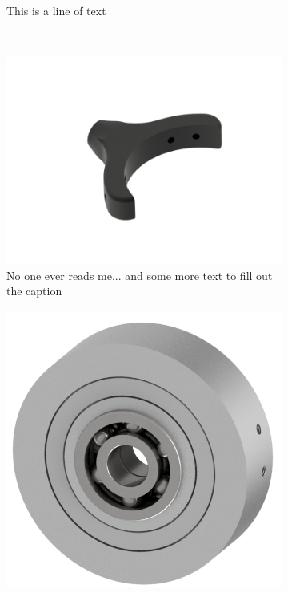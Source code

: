 \begin{figure}[H]
\begin{minipage}{.45\linewidth}
\begin{subfigure}[b]{\linewidth}
			\caption{This is a line of text}
			\label{sfig:pendulumassembly}
		\end{subfigure}\\
		\begin{subfigure}[b]{\linewidth}
			\centering
			\includegraphics[width=\linewidth]{graphics/joint_mount}
			\caption{No one ever reads me... and some more text to fill out the caption}
			\label{sfig:jointmount}
		\end{subfigure}	
	\end{minipage}
	\begin{minipage}{.4\linewidth}
		\begin{subfigure}[t]{\linewidth}
			\centering
			\includegraphics[width=\linewidth]{graphics/joint_mag_assembly}

\end{subfigure}
\end{minipage}
\end{figure}
